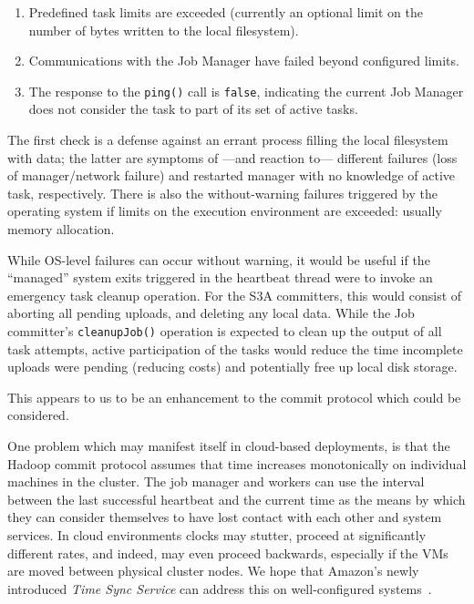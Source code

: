 \documentclass[format=acmsmall, screen=true, review=false]{acmart}
\begin{document}
\begin{enumerate}
  \item Predefined task limits are exceeded
  (currently an optional limit on the number of bytes written to the local filesystem).
  \item Communications with the Job Manager have failed beyond configured limits.
  \item The response to the \texttt{ping()} call is \texttt{false}, indicating the current
  Job Manager does not consider the task to part of its set of active tasks.
\end{enumerate}

The first check is a defense against an errant process filling the local
filesystem with data;
the latter are symptoms of ---and reaction to--- different failures (loss of manager/network failure)
and restarted manager with no knowledge of active task, respectively.
There is also the without-warning failures triggered by the operating system
if limits on the execution environment are exceeded: usually memory allocation.

While OS-level failures can occur without warning, it would be useful if the
``managed'' system exits triggered in the heartbeat thread were to invoke
an emergency task cleanup operation.
For the S3A committers, this would consist of aborting all pending uploads, and
deleting any local data.
While the Job committer's \texttt{cleanupJob()} operation is expected to clean up
the output of all task attempts, active participation of the tasks would
reduce the time incomplete uploads were pending (reducing costs) and
potentially free up local disk storage.

This appears to us to be an enhancement to the commit protocol which could
be considered.


One problem which may manifest itself in cloud-based deployments,
is that the Hadoop commit protocol assumes that time increases monotonically
on individual machines in the cluster.
The job manager and workers can use the interval between the last successful heartbeat
and the current time as the means by which they can consider themselves to have lost
contact with each other and system services.
In cloud environments clocks may stutter, proceed at significantly different rates,
and indeed, may even proceed backwards, especially if the VMs are moved between
physical cluster nodes.
We hope that Amazon's newly introduced \emph{Time Sync Service}
can address this on well-configured systems\ \cite{AWS-clock-service}.
\end{document}
